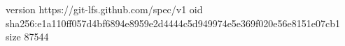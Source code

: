 version https://git-lfs.github.com/spec/v1
oid sha256:e1a110ff057d4bf6894e8959e2d4444c5d949974e5e369f020e56e8151e07cb1
size 87544
